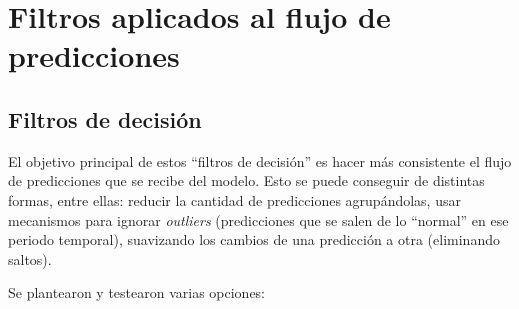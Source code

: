 \section{Filtros aplicados al flujo de predicciones}
\label{sec:filtrosFlujoPredicciones}

\subsection{Filtros de decisión}
\label{subsec:filtros_decision}

El objetivo principal de estos ``filtros de decisión'' es hacer más consistente el flujo de predicciones que se recibe del modelo. Esto se puede conseguir de distintas formas, entre ellas: reducir la cantidad de predicciones agrupándolas, usar mecanismos para ignorar \textit{outliers} (predicciones que se salen de lo ``normal'' en ese periodo temporal), suavizando los cambios de una predicción a otra (eliminando saltos).

Se plantearon y testearon varias opciones:

